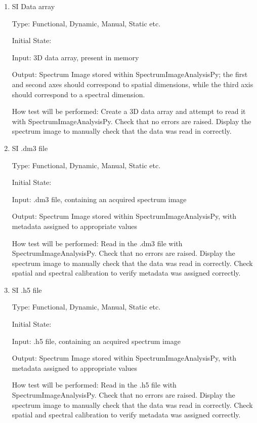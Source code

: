 \documentclass[12pt, titlepage]{article}
\newcommand{\progname}{SpectrumImageAnalysisPy}
\begin{document}
\begin{enumerate}

\item{SI Data array\\}

Type: Functional, Dynamic, Manual, Static etc.
					
Initial State: 
					
Input: 3D data array, present in memory
					
Output: Spectrum Image stored within \progname{}; the first and second axes should correspond to spatial dimensions, while the third axis should correspond to a spectral dimension.
					
How test will be performed: Create a 3D data array and attempt to read it with \progname{}. Check that no errors are raised. Display the spectrum image to manually check that the data was read in correctly.


\item{SI .dm3 file\\}

Type: Functional, Dynamic, Manual, Static etc.

Initial State: 

Input: .dm3 file, containing an acquired spectrum image

Output: Spectrum Image stored within \progname{}, with metadata assigned to appropriate values

How test will be performed: Read in the .dm3 file with \progname{}. Check that no errors are raised. Display the spectrum image to manually check that the data was read in correctly. Check spatial and spectral calibration to verify metadata was assigned correctly.


\item{SI .h5 file\\}

Type: Functional, Dynamic, Manual, Static etc.
					
Initial State: 
					
Input: .h5 file, containing an acquired spectrum image
					
Output: Spectrum Image stored within \progname, with metadata assigned to appropriate values
					
How test will be performed: Read in the .h5 file with \progname{}. Check that no errors are raised. Display the spectrum image to manually check that the data was read in correctly. Check spatial and spectral calibration to verify metadata was assigned correctly.

\end{enumerate}
\end{document}
